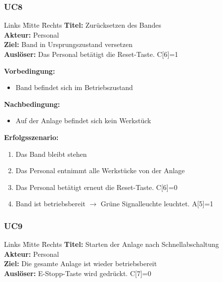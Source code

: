 \documentclass[oneside,a4paper,titlepage]{scrartcl}              %
\begin{document}
\newpage

\subsubsection{UC8}
\begin{tabbing}
  Links \= Mitte \= Rechts \kill
  \textbf{Titel:}    \> \> Zurücksetzen des Bandes\\
  \textbf{Akteur:}   \> \> Personal\\
  \textbf{Ziel:}     \> \> Band in Ursprungszustand versetzen\\
  \textbf{Auslöser:} \> \> Das Personal betätigt die Reset-Taste. C[6]=1\\
\end{tabbing}

\textbf{Vorbedingung:}
\begin{itemize}
  \item Band befindet sich im Betriebszustand
\end{itemize}

\textbf{Nachbedingung:}
\begin{itemize}
  \item Auf der Anlage befindet sich kein Werkstück
\end{itemize}

\textbf{Erfolgsszenario:}
\begin{enumerate}
  \item Das Band bleibt stehen
  \item Das Personal entnimmt alle Werkstücke von der Anlage
  \item Das Personal betätigt erneut die Reset-Taste. C[6]=0
  \item Band ist betriebsbereit $\rightarrow$ Grüne Signalleuchte leuchtet. A[5]=1
\end{enumerate}

\subsubsection{UC9}
\begin{tabbing}
  Links \= Mitte \= Rechts \kill
  \textbf{Titel:}    \> \> Starten der Anlage nach Schnellabschaltung\\
  \textbf{Akteur:}   \> \> Personal\\
  \textbf{Ziel:}     \> \> Die gesamte Anlage ist wieder betriebsbereit\\
  \textbf{Auslöser:} \> \> E-Stopp-Taste wird gedrückt. C[7]=0\\
\end{tabbing}
\end{document}
